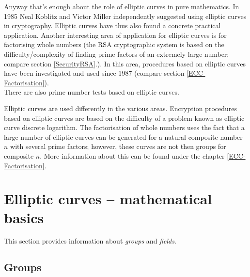 Anyway that's enough about the role of elliptic curves in pure mathematics. 
In 1985 Neal Koblitz and Victor Miller
independently suggested using elliptic curves in cryptography. Elliptic 
curves have thus also found a concrete practical application. 
Another interesting area of application for elliptic curves is for
factorising whole numbers  (the RSA cryptographic system
is based on the  difficulty/complexity of finding prime
factors of an extremely large number;  compare section \ref{SecurityRSA}.).
In this area, procedures based on elliptic curves have been investigated and
used since 1987 (compare section \ref{ECC-Factorisation}). \\
There are also prime number tests based on elliptic
curves.

Elliptic curves are used differently in the various areas. Encryption
procedures based on elliptic curves are based on the difficulty of a problem
known as elliptic curve discrete logarithm.
The factorisation of whole numbers uses the fact that a large number of
elliptic curves can be generated for a natural composite number $n$ with
several prime factors; however, these curves are not then groups for composite
$n$. More information about this can be found under the chapter \ref{ECC-Factorisation}.

\section{Elliptic curves -- mathematical basics}

This section provides information about  {\em groups} and
 {\em fields}.

\subsection{Groups}

